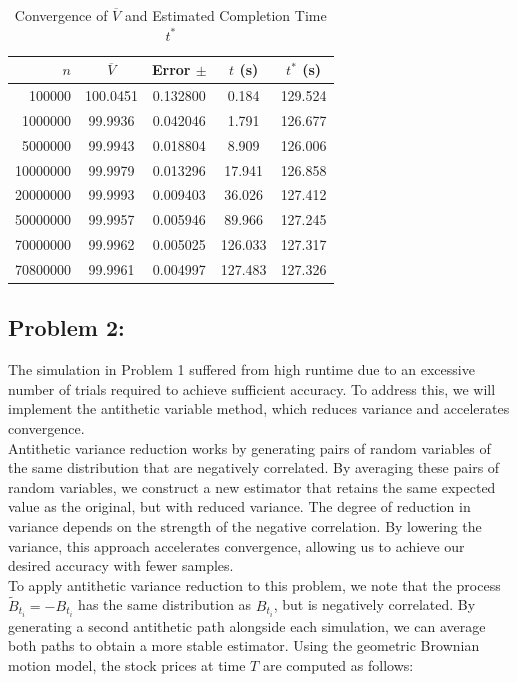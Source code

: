 \documentclass{report}
\begin{document}
\begin{table}[H]
    \centering
    \caption{Convergence of $\overline{V}$ and Estimated Completion Time $t^*$}
    \label{tab:simulation_results}
    \begin{tabular}{rcccc}
        \hline
        $n$ & $\overline{V}$ & Error $\pm$ & $t$ (s) & $t^*$ (s) \\
        \hline
        100000   & 100.0451 & 0.132800 & 0.184   & 129.524 \\
        1000000  & 99.9936  & 0.042046 & 1.791   & 126.677 \\
        5000000  & 99.9943  & 0.018804 & 8.909   & 126.006 \\
        10000000 & 99.9979  & 0.013296 & 17.941  & 126.858 \\
        20000000 & 99.9993  & 0.009403 & 36.026  & 127.412 \\
        50000000 & 99.9957  & 0.005946 & 89.966  & 127.245 \\
        70000000 & 99.9962  & 0.005025 & 126.033 & 127.317 \\
        70800000 & 99.9961  & 0.004997 & 127.483 & 127.326 \\
        \hline
    \end{tabular}
\end{table}


\newpage

\subsection*{Problem 2:}
The simulation in Problem 1 suffered from high runtime due to an excessive number of trials required to achieve sufficient accuracy. To address this, we will implement the antithetic variable method, which reduces variance and accelerates convergence. \\

Antithetic variance reduction works by generating pairs of random variables of the same distribution that are negatively correlated. By averaging these pairs of random variables, we construct a new estimator that retains the same expected value as the original, but with reduced variance. The degree of reduction in variance depends on the strength of the negative correlation. By lowering the variance, this approach accelerates convergence, allowing us to achieve our desired accuracy with fewer samples. \\

To apply antithetic variance reduction to this problem, we note that the process $\widetilde{B}_{t_{i}} = -B_{t_{i}}$ has the same distribution as $B_{t_i}$, but is negatively correlated. By generating a second antithetic path alongside each simulation, we can average both paths to obtain a more stable estimator. Using the geometric Brownian motion model, the stock prices at time $T$ are computed as follows:
\end{document}
